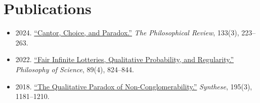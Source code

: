 \documentclass[11pt,letterpaper]{article}
\begin{document}
\section*{Publications}
\begin{itemize}
    \item 2024. \href{https://read.dukeupress.edu/the-philosophical-review/article-abstract/133/3/223/390918/Cantor-Choice-and-Paradox?redirectedFrom=fulltext}{``Cantor, Choice, and Paradox.''} \emph{The Philosophical Review}, 133(3), 223--263.
    \item 2022. \href{https://www.cambridge.org/core/journals/philosophy-of-science/article/fair-infinite-lotteries-qualitative-probability-and-regularity/88F15215C3FB30BA3C642C95DFB87797}{``Fair Infinite Lotteries, Qualitative Probability, and Regularity.''} \emph{Philosophy of Science}, 89(4), 824--844.
    \item 2018. \href{https://link.springer.com/article/10.1007/s11229-016-1261-3}{``The Qualitative Paradox of Non-Conglomerability.''} \emph{Synthese}, 195(3), 1181--1210.
\end{itemize}
\end{document}
